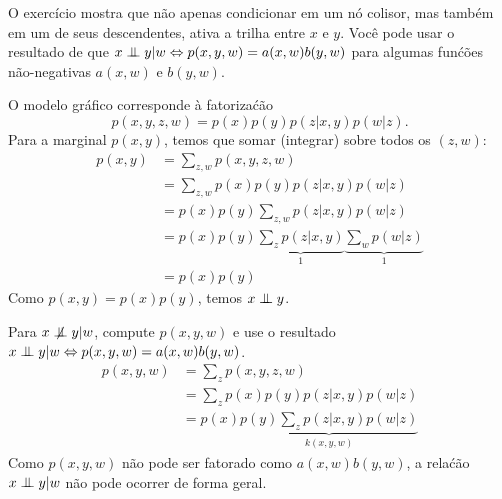 \begin{exenumerate}
    \begin{center}
    \end{center}
    O exerc\'icio mostra que n\~ao apenas condicionar em um n\'o colisor, mas tamb\'em em um de seus descendentes, ativa a trilha entre $x$ e $y$. Voc\^e pode usar o resultado de que $x \mathrel{\perp\mspace{-10mu}\perp} y |w \Leftrightarrow p(x,y,w) = a(x,w)b(y,w)$ para algumas fun\'c\~oes n\~ao-negativas $a(x,w)$ e $b(y,w)$.
    
    \begin{solution}
        O modelo gr\'afico corresponde \`a fatoriza\'c\~ao $$p(x,y,z,w) = p(x) p(y) p(z|x,y) p(w|z).$$
        Para a marginal $p(x,y)$, temos que somar (integrar) sobre todos os $(z,w)$:
        \begin{align}
            p(x,y) &= \sum_{z,w} p(x,y,z,w) \\
            & = \sum_{z,w} p(x) p(y) p(z|x,y) p(w|z)\\
            & = p(x) p(y) \sum_{z,w} p(z| x,y) p(w|z)\\
            & = p(x) p(y) \underbrace{\sum_{z} p(z| x,y)}_{1} \underbrace{\sum_{w} p(w|z)}_{1}\\
            & = p(x) p(y)
        \end{align}
        Como $p(x,y) = p(x) p(y)$, temos $x \mathrel{\perp\mspace{-10mu}\perp} y$.
        
        Para $x \notind y | w$, compute $p(x,y,w)$ e use o resultado $x \mathrel{\perp\mspace{-10mu}\perp} y |w \Leftrightarrow p(x,y,w) = a(x,w)b(y,w)$.
        \begin{align}
            p(x,y,w) & = \sum_z p(x,y,z,w)\\
            & = \sum_z p(x) p(y) p(z|x,y) p(w|z) \\
            & = p(x) \underbrace{p(y) \sum_z p(z|x,y) p(w|z)}_{k(x,y,w)}
        \end{align}
        Como $p(x,y,w)$ n\~ao pode ser fatorado como $a(x,w) b(y,w)$, a rela\'c\~ao $x \mathrel{\perp\mspace{-10mu}\perp} y | w$ n\~ao pode ocorrer de forma geral.
    \end{solution}
    
\end{exenumerate}


